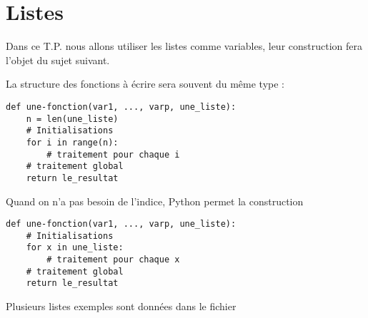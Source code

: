 \chapter{Listes}
\thispagestyle{empty}
{\sf Dans ce T.P. nous allons utiliser les listes comme variables, leur construction fera l'objet du sujet suivant.

La structure des fonctions à écrire sera souvent du même type :
\begin{lstlisting}
def une-fonction(var1, ..., varp, une_liste):
    n = len(une_liste)
    # Initialisations
    for i in range(n):
        # traitement pour chaque i
    # traitement global
    return le_resultat
\end{lstlisting}

Quand on n'a pas besoin de l'indice, Python permet la construction 
\begin{lstlisting}
def une-fonction(var1, ..., varp, une_liste):
    # Initialisations
    for x in une_liste:
        # traitement pour chaque x
    # traitement global
    return le_resultat
\end{lstlisting}

Plusieurs listes exemples sont données dans le fichier 
}
